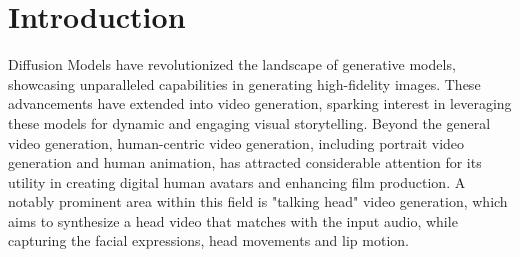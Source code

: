 \documentclass[runningheads]{llncs}
\begin{document}
\section{Introduction}
\label{sec:intro}
Diffusion Models have revolutionized the landscape of generative models, showcasing unparalleled capabilities in generating high-fidelity images\cite{ddpm,ldm,DiffusionNonequ,DiffusionBeatGAN,DiT}. These advancements have extended into video generation, sparking interest in leveraging these models for dynamic and engaging visual storytelling\cite{ho2022video,bartal2024lumiere,2023i2vgenxl}. Beyond the general video generation, human-centric video generation, including portrait video generation\cite{sun2023vividtalk, diffused_head, sadtalker, dreamtalk} and human animation\cite{animatediff, animate_anyone}, has attracted considerable attention for its utility in creating digital human avatars and enhancing film production. 
A notably prominent area within this field is "talking head" video generation, which aims to synthesize 
a head video that matches with the input audio, while capturing the facial expressions, head movements and lip motion. 
\end{document}
